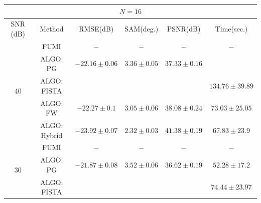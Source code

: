 \begin{table}[h]
{\begin{threeparttable}
\begin{tabular}{|c|c|c|c|c|c|}
\multicolumn{ 6}{|c|}{$N =16$} \tabularnewline \hline
SNR (dB)            & Method                 & RMSE(dB)                              & SAM(deg.)                           & PSNR(dB)                             & Time(sec.)                               \tabularnewline \hline
\multirow{5}{*}{40} & FUMI\tnote{2}          & $-$                                   & $-$                                 & $-$                                  & $-$                                      \tabularnewline
                    & ALGO: PG               &                    {$-22.16\pm 0.06$} &                    {$3.36\pm 0.05$} &                    {$37.33\pm 0.16$} & \cellcolor{red! 10}{$56.64\pm 18.45$}    \tabularnewline
                    & ALGO: FISTA            & \cellcolor{red! 10}{$-25.45\pm 0.03$} & \cellcolor{red! 10}{$1.57\pm 0.02$} & \cellcolor{red! 10}{$45.18\pm 0.13$} &                    {$134.76\pm 39.89$}   \tabularnewline
                    & ALGO: FW               &                    {$-22.27\pm 0.1$}  &                    {$3.05\pm 0.06$} &                    {$38.08\pm 0.24$} &                    {$73.03\pm 25.05$}    \tabularnewline
                    & ALGO: Hybrid \tnote{1} &                    {$-23.92\pm 0.07$} &                    {$2.32\pm 0.03$} &                    {$41.38\pm 0.19$} &                    {$67.83\pm 23.9$}     \tabularnewline \hline \hline
\multirow{5}{*}{30} & FUMI\tnote{2}          & $-$                                   & $-$                                 & $-$                                  & $-$                                      \tabularnewline
                    & ALGO: PG               &                    {$-21.87\pm 0.08$} &                    {$3.52\pm 0.06$} &                    {$36.62\pm 0.19$} &                    {$52.28\pm 17.2$}     \tabularnewline
                    & ALGO: FISTA            & \cellcolor{red! 10}{$-23.82\pm 0.09$} & \cellcolor{red! 10}{$2.19\pm 0.04$} & \cellcolor{red! 10}{$40.43\pm 0.15$} &                    {$74.44\pm 23.97$}    \tabularnewline

\end{tabular}
\end{threeparttable}}
\end{table}
